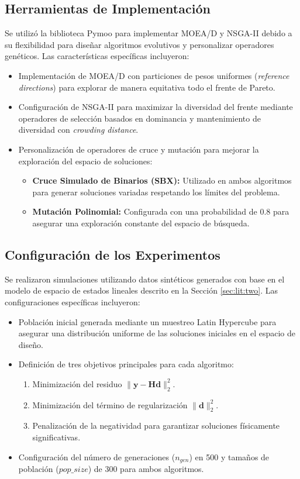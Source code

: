 \subsection{Herramientas de Implementación}
Se utilizó la biblioteca Pymoo para implementar MOEA/D y NSGA-II debido a su flexibilidad para diseñar algoritmos evolutivos y personalizar operadores genéticos. Las características específicas incluyeron:
\begin{itemize}
    \item Implementación de MOEA/D con particiones de pesos uniformes (\textit{reference directions}) para explorar de manera equitativa todo el frente de Pareto.
    \item Configuración de NSGA-II para maximizar la diversidad del frente mediante operadores de selección basados en dominancia y mantenimiento de diversidad con \textit{crowding distance}.
    \item Personalización de operadores de cruce y mutación para mejorar la exploración del espacio de soluciones:
    \begin{itemize}
        \item \textbf{Cruce Simulado de Binarios (SBX):} Utilizado en ambos algoritmos para generar soluciones variadas respetando los límites del problema.
        \item \textbf{Mutación Polinomial:} Configurada con una probabilidad de 0.8 para asegurar una exploración constante del espacio de búsqueda.
    \end{itemize}
\end{itemize}

\subsection{Configuración de los Experimentos}
Se realizaron simulaciones utilizando datos sintéticos generados con base en el modelo de espacio de estados lineales descrito en la Sección \ref{sec:lit:two}. Las configuraciones específicas incluyeron:
\begin{itemize}
    \item Población inicial generada mediante un muestreo Latin Hypercube para asegurar una distribución uniforme de las soluciones iniciales en el espacio de diseño.
    \item Definición de tres objetivos principales para cada algoritmo:
    \begin{enumerate}
        \item Minimización del residuo \( \| \mathbf{y} - \mathbf{H} \mathbf{d} \|_2^2 \).
        \item Minimización del término de regularización \( \| \mathbf{d} \|_2^2 \).
        \item Penalización de la negatividad para garantizar soluciones físicamente significativas.
    \end{enumerate}
    \item Configuración del número de generaciones (\( n_{gen} \)) en 500 y tamaños de población (\( pop\_size \)) de 300 para ambos algoritmos.
\end{itemize}

